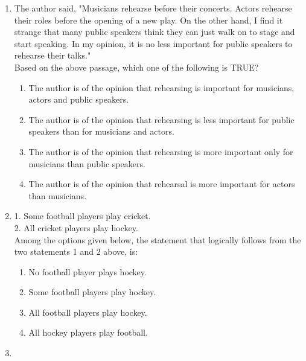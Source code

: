 \documentclass[journal]{IEEEtran}
\begin{document}
\begin{enumerate}
\item The author said, "Musicians rehearse before their concerts. Actors rehearse their roles before the opening of a new play. On the other hand, I find it strange that many public speakers think they can just walk on to stage and start speaking. In my opinion, it is no less important for public speakers to rehearse their talks."\\
Based on the above passage, which one of the following is TRUE?
\begin{multicols}{2}
    \begin{enumerate}
        \item The author is of the opinion that rehearsing is important for musicians, actors and public speakers.
        \item The author is of the opinion that rehearsing is less important for public speakers than for musicians and actors.
        \item The author is of the opinion that rehearsing is more important only for musicians than public speakers.
        \item The author is of the opinion that rehearsal is more important for actors than musicians.
    \end{enumerate}
\end{multicols}

\item 1. Some football players play cricket.\\
2. All cricket players play hockey.\\
Among the options given below, the statement that logically follows from the two statements 1 and 2 above, is:
\begin{multicols}{2}
    \begin{enumerate}
        \item No football player plays hockey.
        \item Some football players play hockey.
        \item All football players play hockey.
        \item All hockey players play football.
    \end{enumerate}
\end{multicols}

\item {}
\end{enumerate}
\end{document}
